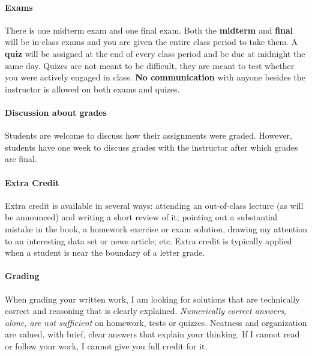 \documentclass[11pt]{article}
\begin{document}
\paragraph{Exams}
There is one midterm exam and one final exam.
Both the \textbf{midterm} and \textbf{final} will be in-class exams and you are given the entire class period to take them.
A \textbf{quiz} will be assigned at the end of every class period and be due at midnight the same day. 
Quizes are not meant to be difficult, they are meant to test whether you were actively engaged in class. \textbf{No communication} with anyone besides the instructor is allowed on both exams and quizes.

\paragraph{Discussion about grades}
Students are welcome to discuss how their assignments were graded. However, students have one week to discuss grades with the instructor after which grades are final. 

\paragraph{Extra Credit}
Extra credit is available in several ways: attending an out-of-class lecture (as will be announced) and writing a short review of it; pointing out a substantial mistake in the book, a homework exercise or exam solution, drawing my attention to an interesting data set or news article; etc. Extra credit is typically applied when a student is near the boundary of a letter grade.

\paragraph{Grading}
When grading your written work, I am looking for solutions that are technically correct and reasoning that is clearly explained.  \emph{Numerically correct answers, alone, are not sufficient} on homework, tests or quizzes.  Neatness and organization are valued, with brief, clear answers that explain your thinking.  If I cannot read or follow your work, I cannot give you full credit for it.
\end{document}
